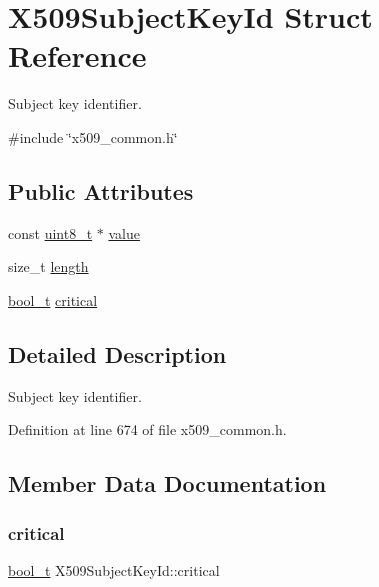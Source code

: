\hypertarget{structX509SubjectKeyId}{}\section{X509\+Subject\+Key\+Id Struct Reference}
\label{structX509SubjectKeyId}


Subject key identifier.  




{\ttfamily \#include \char`\"{}x509\+\_\+common.\+h\char`\"{}}

\subsection*{Public Attributes}
\begin{DoxyCompactItemize}
\item 
const \hyperlink{stdint_8h_aba7bc1797add20fe3efdf37ced1182c5}{uint8\+\_\+t} $\ast$ \hyperlink{structX509SubjectKeyId_ac13791883d5af3098c8fcecd596f4737}{value}
\item 
size\+\_\+t \hyperlink{structX509SubjectKeyId_ae72259e33329d3224c90547e63f95804}{length}
\item 
\hyperlink{compiler__port_8h_a812d16e5494522586b3784e55d479912}{bool\+\_\+t} \hyperlink{structX509SubjectKeyId_abae7eb488122b99c3413adb35d04d7f2}{critical}
\end{DoxyCompactItemize}


\subsection{Detailed Description}
Subject key identifier. 

Definition at line 674 of file x509\+\_\+common.\+h.



\subsection{Member Data Documentation}
\mbox{\label{structX509SubjectKeyId_abae7eb488122b99c3413adb35d04d7f2}} 
\subsubsection{\texorpdfstring{critical}{critical}}
{\footnotesize\ttfamily \hyperlink{compiler__port_8h_a812d16e5494522586b3784e55d479912}{bool\+\_\+t} X509\+Subject\+Key\+Id\+::critical}



